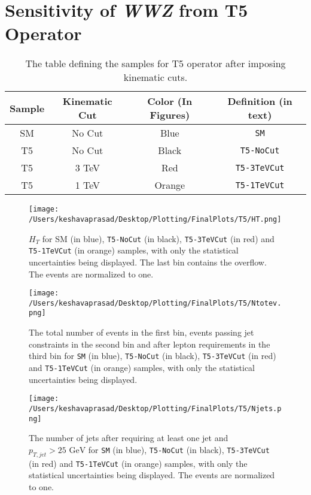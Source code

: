 \section{Sensitivity of \textit{WWZ} from T5 Operator}
\begin{table}
	\centering
	\begin{tabular}{|c|c|c|c|}
		\hline
		Sample & Kinematic Cut & Color (In Figures) & Definition (in text)\\
		\hline \hline
		SM & No Cut & Blue & \texttt{SM}\\
		\hline
		T5 & No Cut & Black & \texttt{T5-NoCut} \\
		\hline
		T5 & 3 TeV & Red & \texttt{T5-3TeVCut}\\
		\hline
		T5 & 1 TeV & Orange & \texttt{T5-1TeVCut} \\
		\hline
	\end{tabular}
	\caption{The table defining the samples for T5 operator after imposing kinematic cuts.}
	\label{table6}
\end{table}
\begin{figure}[!htb]
	\centering
	\texttt{[image: /Users/keshavaprasad/Desktop/Plotting/FinalPlots/T5/HT.png]}
	\caption{$H_{T}$ for SM (in blue), \texttt{T5-NoCut} (in black), \texttt{T5-3TeVCut} (in red) and \texttt{T5-1TeVCut} (in orange)  samples, with only the statistical uncertainties being displayed. The last bin contains the overflow. The events are normalized to one.}
	\label{T5-HT}
\end{figure}

\begin{figure}[!htb]
	\centering
	\texttt{[image: /Users/keshavaprasad/Desktop/Plotting/FinalPlots/T5/Ntotev.png]}
	\caption{The total number of events in the first bin, events passing jet constraints in the second bin and after lepton requirements in the third bin for \texttt{SM} (in blue), \texttt{T5-NoCut} (in black), \texttt{T5-3TeVCut} (in red) and \texttt{T5-1TeVCut} (in orange) samples, with only the statistical uncertainties being displayed.}
	\label{T5Cut flow Histogram-PostCuts}
\end{figure}

\begin{figure}[!htb]%
	\centering
	\texttt{[image: /Users/keshavaprasad/Desktop/Plotting/FinalPlots/T5/Njets.png]}
	\caption{The number of jets after requiring at least one jet and $p_{T,jet}>25 \text{ GeV}$  for \texttt{SM} (in blue), \texttt{T5-NoCut} (in black), \texttt{T5-3TeVCut} (in red) and \texttt{T5-1TeVCut} (in orange) samples, with only the statistical uncertainties being displayed. The events are normalized to one.}
	\label{T5NJets-PostCuts}
\end{figure}

